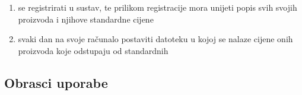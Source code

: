 \begin{packed_enum}
				\begin{enumerate}
					
					\item se registrirati u sustav, te prilikom registracije mora unijeti popis svih svojih proizvoda i njihove standardne cijene
					\item svaki dan na svoje računalo postaviti datoteku u kojoj se nalaze cijene onih proizvoda koje odstupaju od standardnih
        	        
                        
					
				\end{enumerate}

    
			\end{packed_enum}
			
			\eject 
			
			
				
			\subsection{Obrasci uporabe}
				
				
					

	
						
	
